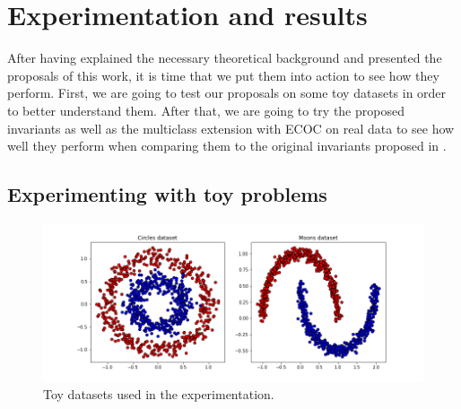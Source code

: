 \chapter{Experimentation and results}
\label{Chapter4}

After having explained the necessary theoretical background and presented the proposals
of this work, it is time that we put them into action to see how they perform. First, we are going
to test our proposals on some toy datasets in order to better understand them. After that, we are going
to try the proposed invariants as well as the multiclass extension with ECOC on real data to see how
well they perform when comparing them to the original invariants proposed in \cite{Vapnik2019}.

\section{Experimenting with toy problems}


\begin{figure}
    \centering
    \includegraphics[width=\textwidth]{thesis/Figures/toy_datasets.png}
    \caption{Toy datasets used in the experimentation.}
    \label{fig:toy_datasets}
\end{figure}

